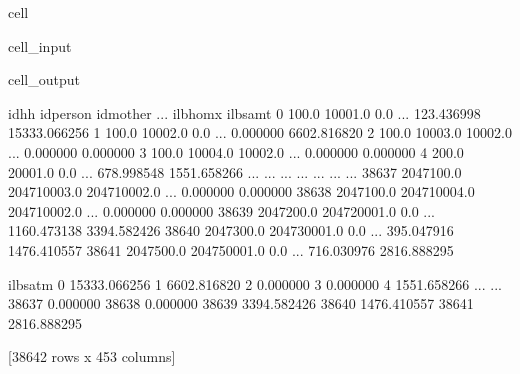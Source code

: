 \documentclass[letterpaper,10pt,english]{sphinxmanual}
\begin{document}
\begin{sphinxuseclass}{cell}
\begin{sphinxuseclass}{cell_input}
\begin{sphinxVerbatim}[commandchars=\\\{\}]
\PYG{p}{[}\PYG{p}{]}
\end{sphinxVerbatim}

\end{sphinxuseclass}
\begin{sphinxuseclass}{cell_output}
\begin{sphinxVerbatim}[commandchars=\\\{\}]
            idhh     idperson     idmother  ...     il\PYGZus{}bhomx      il\PYGZus{}bsamt  \PYGZbs{}
0          100.0      10001.0          0.0  ...   123.436998  15333.066256   
1          100.0      10002.0          0.0  ...     0.000000   6602.816820   
2          100.0      10003.0      10002.0  ...     0.000000      0.000000   
3          100.0      10004.0      10002.0  ...     0.000000      0.000000   
4          200.0      20001.0          0.0  ...   678.998548   1551.658266   
...          ...          ...          ...  ...          ...           ...   
38637  2047100.0  204710003.0  204710002.0  ...     0.000000      0.000000   
38638  2047100.0  204710004.0  204710002.0  ...     0.000000      0.000000   
38639  2047200.0  204720001.0          0.0  ...  1160.473138   3394.582426   
38640  2047300.0  204730001.0          0.0  ...   395.047916   1476.410557   
38641  2047500.0  204750001.0          0.0  ...   716.030976   2816.888295   

           il\PYGZus{}bsatm  
0      15333.066256  
1       6602.816820  
2          0.000000  
3          0.000000  
4       1551.658266  
...             ...  
38637      0.000000  
38638      0.000000  
38639   3394.582426  
38640   1476.410557  
38641   2816.888295  

[38642 rows x 453 columns]
\end{sphinxVerbatim}

\end{sphinxuseclass}
\end{sphinxuseclass}
\sphinxstepscope
\end{document}
